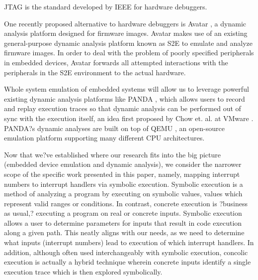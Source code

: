 \documentclass[letterpaper, 10 pt, conference]{ieeeconf}
\begin{document}
JTAG \cite{jtag} is the standard developed by IEEE for hardware debuggers.  

One recently proposed alternative to hardware debuggers is Avatar \cite{avatar}, a dynamic analysis platform designed for firmware images. Avatar makes use of an existing general-purpose dynamic analysis platform known as S2E \cite{s2e} to emulate and analyze firmware images. In order to deal with the problem of poorly specified peripherals in embedded devices, Avatar forwards all attempted interactions with the peripherals in the S2E environment to the actual hardware. 

Whole system emulation of embedded systems will allow us to leverage powerful existing dynamic analysis platforms like PANDA \cite{panda}, which allows users to record and replay execution traces so that dynamic analysis can be performed out of sync with the execution itself, an idea first proposed by Chow et. al. at VMware \cite{jchow}. PANDA?s dynamic analyses are built on top of QEMU \cite{qemu}, an open-source emulation platform supporting many different CPU architectures. 

Now that we?ve established where our research fits into the big picture (embedded device emulation and dynamic analysis), we consider the narrower scope of the specific work presented in this paper, namely, mapping interrupt numbers to interrupt handlers via symbolic execution. Symbolic execution \cite{jking} is a method of analyzing a program by executing on symbolic values, values which represent valid ranges or conditions. In contrast, concrete execution is ?business as usual,? executing a program on real or concrete inputs. Symbolic execution allows a user to determine parameters for inputs that result in code execution along a given path. This neatly aligns with our needs, as we need to determine what inputs (interrupt numbers) lead to execution of which interrupt handlers. In addition, although often used interchangeably with symbolic execution, concolic execution \cite{ksen} is actually a hybrid technique wherein concrete inputs identify a single execution trace which is then explored symbolically. 
\end{document}
